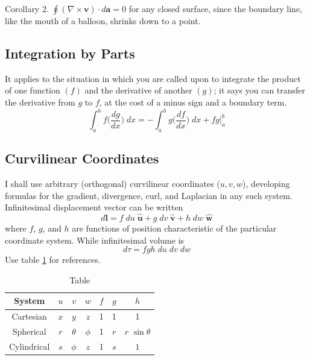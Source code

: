 \documentclass[../../../main.tex]{subfiles}
\begin{document}
Corollary 2. $\oint (\nabla \times \mathbf{v})\cdot d\mathbf{a}=0$ for any closed surface, since the boundary line, like the mouth of a balloon, shrinks down to a point.

\subsection{Integration by Parts}
It applies to the situation in which you are called upon to integrate the product of one function $( f )$ and the derivative of another $(g)$; it says you can transfer the derivative from $g$ to $f$, at the cost of a minus sign and a boundary term.
\begin{equation*}
    \int_{a}^{b} f\bigg(\frac{dg}{dx}\bigg)\;dx=-\int_{a}^{b} g\bigg(\frac{df}{dx}\bigg)\;dx+ fg \bigg\lvert_{a}^{b}
\end{equation*}

\subsection{Curvilinear Coordinates}
I shall use arbitrary (orthogonal) curvilinear coordinates ($u, v, w$), developing formulas for the gradient, divergence, curl, and Laplacian in any such system. Infinitesimal displacement vector can be written
\begin{equation*}
    d\mathbf{l}=f\;d u \;\mathbf{\hat{u}} +g \;d v \;\mathbf{\hat{v}}+h \;d w \;\mathbf{\hat{w}}
\end{equation*}
where $f$, $g$, and $h$ are functions of position characteristic of the particular coordinate system. While infinitesimal volume is
\begin{equation*}
    d\tau=fgh\; du \;dv \;dw
\end{equation*}
Use table \ref{T1} for references.

\begin{table}
    \centering
    \caption{Table}
    \begin{tabular}{c c c c c c c }
        \toprule
        System      & $u$ & $v$      & $w$    & $f$ & $g$ & $h$               \\
        \midrule
        Cartesian   & $x$ & $y$      & $z$    & 1   & 1   & 1                 \\
        Spherical   & $r$ & $\theta$ & $\phi$ & 1   & $r$ & $r$ $\sin \theta$ \\
        Cylindrical & $s$ & $\phi$   & $z$    & 1   & $s$ & $1$               \\
        \bottomrule
    \end{tabular}
    \label{T1}
\end{table}
\end{document}
